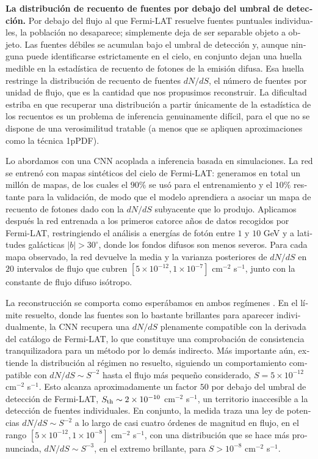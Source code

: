 \begin{otherlanguage}{spanish}
\textbf{La distribución de recuento de fuentes por debajo del umbral de detección.} Por debajo del flujo al que Fermi-LAT resuelve fuentes puntuales individuales, la población no desaparece; simplemente deja de ser separable objeto a objeto. Las fuentes débiles se acumulan bajo el umbral de detección y, aunque ninguna puede identificarse estrictamente en el cielo, en conjunto dejan una huella medible en la estadística de recuento de fotones de la emisión difusa. Esa huella restringe la distribución de recuento de fuentes $dN/dS$, el número de fuentes por unidad de flujo, que es la cantidad que nos propusimos reconstruir. La dificultad estriba en que recuperar una distribución a partir únicamente de la estadística de los recuentos es un problema de inferencia genuinamente difícil, para el que no se dispone de una verosimilitud tratable (a menos que se apliquen aproximaciones como la técnica 1pPDF).

Lo abordamos con una CNN acoplada a inferencia basada en simulaciones. La red se entrenó con mapas sintéticos del cielo de Fermi-LAT: generamos en total un millón de mapas, de los cuales el $90\%$ se usó para el entrenamiento y el $10\%$ restante para la validación, de modo que el modelo aprendiera a asociar un mapa de recuento de fotones dado con la $dN/dS$ subyacente que lo produjo. Aplicamos después la red entrenada a los primeros catorce años de datos recogidos por Fermi-LAT, restringiendo el análisis a energías de fotón entre $1$ y $10$ GeV y a latitudes galácticas $|b| > 30^\circ$, donde los fondos difusos son menos severos. Para cada mapa observado, la red devuelve la media y la varianza posteriores de $dN/dS$ en $20$ intervalos de flujo que cubren $[5\times10^{-12}, 1\times10^{-7}]$ cm$^{-2}$ s$^{-1}$, junto con la constante de flujo difuso isótropo.

La reconstrucción se comporta como esperábamos en ambos regímenes \cite{Amerio:2023uet}. En el límite resuelto, donde las fuentes son lo bastante brillantes para aparecer individualmente, la CNN recupera una $dN/dS$ plenamente compatible con la derivada del catálogo de Fermi-LAT, lo que constituye una comprobación de consistencia tranquilizadora para un método por lo demás indirecto. Más importante aún, extiende la distribución al régimen no resuelto, siguiendo un comportamiento compatible con $dN/dS \sim S^{-2}$ hasta el flujo más pequeño considerado, $S = 5\times10^{-12}$ cm$^{-2}$ s$^{-1}$. Esto alcanza aproximadamente un factor $50$ por debajo del umbral de detección de Fermi-LAT, $S_{\rm th} \sim 2\times10^{-10}$ cm$^{-2}$ s$^{-1}$, un territorio inaccesible a la detección de fuentes individuales. En conjunto, la medida traza una ley de potencias $dN/dS \sim S^{-2}$ a lo largo de casi cuatro órdenes de magnitud en flujo, en el rango $[5\times10^{-12}, 1\times10^{-8}]$ cm$^{-2}$ s$^{-1}$, con una distribución que se hace más pronunciada, $dN/dS \sim S^{-3}$, en el extremo brillante, para $S > 10^{-8}$ cm$^{-2}$ s$^{-1}$.


\end{otherlanguage}
